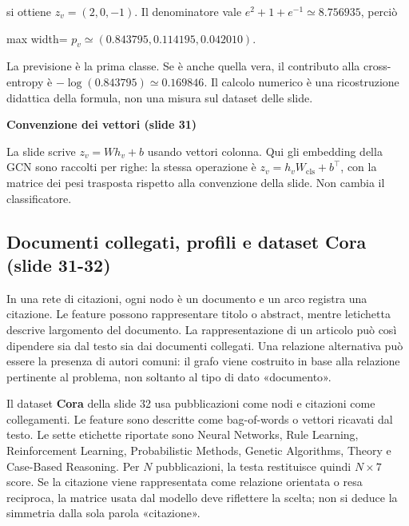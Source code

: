 \documentclass[11pt,a4paper,oneside,openany]{book}
\renewenvironment{quote}{\list{}{\leftmargin=1em\rightmargin=0pt}\item\relax}{\endlist}
\begin{document}
si ottiene \(z_v=(2,0,-1)\). Il denominatore vale \(e^2+1+e^{-1}\simeq8.756935\), perciò

\begin{center}
\begin{adjustbox}{max width=\linewidth}
$\displaystyle p_v\simeq(0.843795,0.114195,0.042010).$
\end{adjustbox}
\end{center}

La previsione è la prima classe. Se è anche quella vera, il contributo alla cross-entropy è \(-\log(0.843795)\simeq0.169846\). Il calcolo numerico è una ricostruzione didattica della formula, non una misura sul dataset delle slide.

\begin{quote}
\textbf{Convenzione dei vettori (slide 31)}
\end{quote}

\begin{quote}
La slide scrive \(z_v=Wh_v+b\) usando vettori colonna. Qui gli embedding della GCN sono raccolti per righe: la stessa operazione è \(z_v=h_vW_{\mathrm{cls}}+b^\top\), con la matrice dei pesi trasposta rispetto alla convenzione della slide. Non cambia il classificatore.
\end{quote}

\subsection{Documenti collegati, profili e dataset Cora (slide 31-32)}\label{f05-n30-r612}

In una rete di citazioni, ogni nodo è un documento e un arco registra una citazione. Le feature possono rappresentare titolo o abstract, mentre l\textquotesingle etichetta descrive l\textquotesingle argomento del documento. La rappresentazione di un articolo può così dipendere sia dal testo sia dai documenti collegati. Una relazione alternativa può essere la presenza di autori comuni: il grafo viene costruito in base alla relazione pertinente al problema, non soltanto al tipo di dato «documento».

Il dataset \textbf{Cora} della slide 32 usa pubblicazioni come nodi e citazioni come collegamenti. Le feature sono descritte come bag-of-words o vettori ricavati dal testo. Le sette etichette riportate sono Neural Networks, Rule Learning, Reinforcement Learning, Probabilistic Methods, Genetic Algorithms, Theory e Case-Based Reasoning. Per \(N\) pubblicazioni, la testa restituisce quindi \(N\times7\) score. Se la citazione viene rappresentata come relazione orientata o resa reciproca, la matrice usata dal modello deve riflettere la scelta; non si deduce la simmetria dalla sola parola «citazione».
\end{document}
